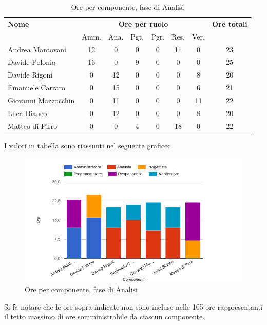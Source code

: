 \begin{table}[H]
\begin{tabular}{lccccccc}
\toprule
    \textbf{Nome}  & \multicolumn{6}{c}{\textbf{Ore per ruolo}} & \textbf{Ore totali} \\
     & Amm. & Ana. & Pgt. & Pgr. & Res. & Ver. & \\
    \midrule
    
	Andrea Mantovani & 12 & 0 & 0 & 0 & 11 & 0 & 23 \\
	Davide Polonio & 16 & 0 & 9 & 0 & 0 & 0 & 25 \\
	Davide Rigoni & 0 & 12 & 0 & 0 & 0 & 8 & 20 \\
	Emanuele Carraro & 0 & 15 & 0 & 0 & 0 & 6 & 21 \\
	Giovanni Mazzocchin & 0 & 11 & 0 & 0 & 0 & 11 & 22 \\
	Luca Bianco & 0 & 12 & 0 & 0 & 0 & 8 & 20 \\
	Matteo di Pirro & 0 & 0 & 4 & 0 & 18 & 0 & 22 \\
    
    \bottomrule
\end{tabular}
\caption{Ore per componente, fase di Analisi}
\end{table}


I valori in tabella sono riassunti nel seguente grafico: \\ 

    \begin{figure}[H]
      \begin{center}
        \includegraphics[width=12cm]{res/img/orePerComponenteAnalisi.png}
      \caption{Ore per componente, fase di Analisi}
      \end{center} 
    \end{figure}    
    
Si fa notare che le ore sopra indicate non sono incluse nelle 105 ore rappresentanti il tetto massimo di ore somministrabile da ciascun componente.


